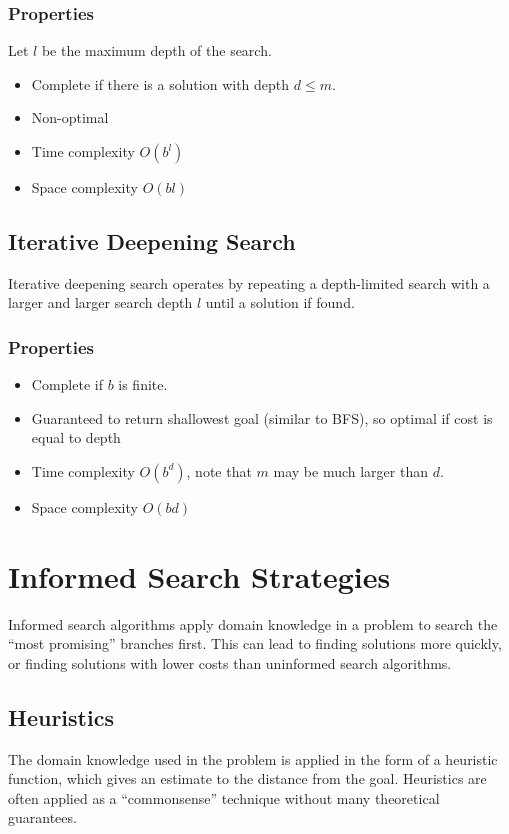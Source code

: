 \documentclass[12pt,titlepage]{article}
\begin{document}
      \subsubsection{Properties}
        Let $l$ be the maximum depth of the search.
        \begin{itemize}
          \item Complete if there is a solution with depth $d \leq m$.
          \item Non-optimal
          \item Time complexity $O(b^l)$
          \item Space complexity $O(bl)$
        \end{itemize}

    \subsection{Iterative Deepening Search}
      Iterative deepening search operates by repeating a depth-limited search with a larger and larger
      search depth $l$ until a solution if found.

      \subsubsection{Properties}
        \begin{itemize}
          \item Complete if $b$ is finite.
          \item Guaranteed to return shallowest goal (similar to BFS), so optimal if cost is equal to depth
          \item Time complexity $O(b^d)$, note that $m$ may be much larger than $d$.
          \item Space complexity $O(bd)$
        \end{itemize}

  \section{Informed Search Strategies}
    Informed search algorithms apply domain knowledge in a problem to search the ``most promising'' branches first. This can lead to
    finding solutions more quickly, or finding solutions with lower costs than uninformed search algorithms.

    \subsection{Heuristics}
      The domain knowledge used in the problem is applied in the form of a heuristic function, which gives an estimate to the distance
      from the goal. Heuristics are often applied as a ``commonsense'' technique without many theoretical guarantees.
\end{document}
